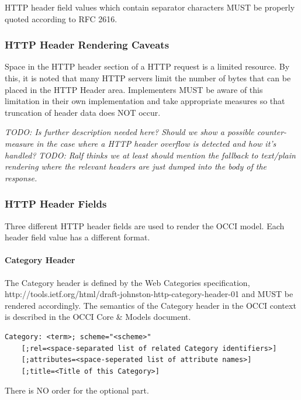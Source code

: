 \documentclass[10pt,a4paper]{article}
\begin{document}
HTTP header field values which contain separator characters MUST be properly quoted according to RFC 2616.

\subsubsection{HTTP Header Rendering Caveats}

Space in the HTTP header section of a HTTP request is a limited resource. By this, it is noted that many HTTP servers limit the number of bytes that can be placed in the HTTP Header area. Implementers MUST be aware of this limitation in their own implementation and take appropriate measures so that truncation of header data does NOT occur. 

\emph{TODO: Is further description needed here? Should we show a possible counter-measure in the case where a HTTP header overflow is detected and how it's handled?}
\emph{TODO: Ralf thinks we at least should mention the fallback to text/plain rendering where the relevant headers are just dumped into the body of the response.}

\subsubsection{HTTP Header Fields}

Three different HTTP header fields are used to render the OCCI model. Each header field value has a different format.

\paragraph{Category Header}

The Category header is defined by the Web Categories specification, http://tools.ietf.org/html/draft-johnston-http-category-header-01 and MUST be rendered accordingly. The semantics of the Category header in the OCCI context is described in the OCCI Core \& Models document.

\begin{verbatim}
Category: <term>; scheme="<scheme>"
    [;rel=<space-separated list of related Category identifiers>]
    [;attributes=<space-seperated list of attribute names>]
    [;title=<Title of this Category>]    
\end{verbatim}

There is NO order for the optional part.
\end{document}
